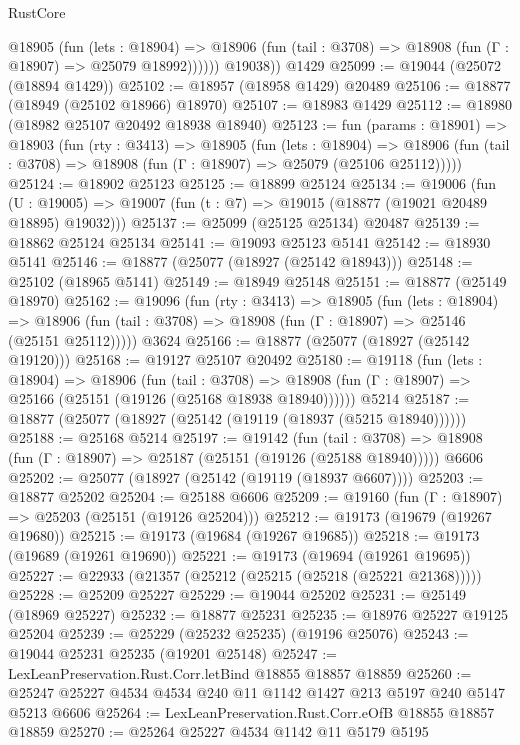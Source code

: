 \begin{lexlean}{RustCore}
\begin{coremodule}
            @18905
              (fun (lets : @18904) =>
              @18906 (fun (tail : @3708) => @18908 (fun (Γ : @18907) => @25079 @18992))))))
        @19038))
    @1429
@25099 := @19044 (@25072 (@18894 @1429))
@25102 := @18957 (@18958 @1429) @20489
@25106 := @18877 (@18949 (@25102 @18966) @18970)
@25107 := @18983 @1429
@25112 := @18980 (@18982 @25107 @20492 @18938 @18940)
@25123 := fun (params : @18901) =>
  @18903
    (fun (rty : @3413) =>
    @18905
      (fun (lets : @18904) =>
      @18906 (fun (tail : @3708) => @18908 (fun (Γ : @18907) => @25079 (@25106 @25112)))))
@25124 := @18902 @25123
@25125 := @18899 @25124
@25134 := @19006
    (fun (U : @19005) => @19007 (fun (t : @7) => @19015 (@18877 (@19021 @20489 @18895) @19032)))
@25137 := @25099 (@25125 @25134) @20487
@25139 := @18862 @25124 @25134
@25141 := @19093 @25123 @5141
@25142 := @18930 @5141
@25146 := @18877 (@25077 (@18927 (@25142 @18943)))
@25148 := @25102 (@18965 @5141)
@25149 := @18949 @25148
@25151 := @18877 (@25149 @18970)
@25162 := @19096
    (fun (rty : @3413) =>
    @18905
      (fun (lets : @18904) =>
      @18906 (fun (tail : @3708) => @18908 (fun (Γ : @18907) => @25146 (@25151 @25112)))))
    @3624
@25166 := @18877 (@25077 (@18927 (@25142 @19120)))
@25168 := @19127 @25107 @20492
@25180 := @19118
    (fun (lets : @18904) =>
    @18906
      (fun (tail : @3708) =>
      @18908 (fun (Γ : @18907) => @25166 (@25151 (@19126 (@25168 @18938 @18940))))))
    @5214
@25187 := @18877 (@25077 (@18927 (@25142 (@19119 (@18937 (@5215 @18940))))))
@25188 := @25168 @5214
@25197 := @19142
    (fun (tail : @3708) => @18908 (fun (Γ : @18907) => @25187 (@25151 (@19126 (@25188 @18940)))))
    @6606
@25202 := @25077 (@18927 (@25142 (@19119 (@18937 @6607))))
@25203 := @18877 @25202
@25204 := @25188 @6606
@25209 := @19160 (fun (Γ : @18907) => @25203 (@25151 (@19126 @25204)))
@25212 := @19173 (@19679 (@19267 @19680))
@25215 := @19173 (@19684 (@19267 @19685))
@25218 := @19173 (@19689 (@19261 @19690))
@25221 := @19173 (@19694 (@19261 @19695))
@25227 := @22933 (@21357 (@25212 (@25215 (@25218 (@25221 @21368)))))
@25228 := @25209 @25227
@25229 := @19044 @25202
@25231 := @25149 (@18969 @25227)
@25232 := @18877 @25231
@25235 := @18976 @25227 @19125 @25204
@25239 := @25229 (@25232 @25235) (@19196 @25076)
@25243 := @19044 @25231 @25235 (@19201 @25148)
@25247 := LexLeanPreservation.Rust.Corr.letBind @18855 @18857 @18859
@25260 := @25247 @25227 @4534 @4534 @240 @11 @1142 @1427 @213 @5197 @240 @5147 @5213 @6606
@25264 := LexLeanPreservation.Rust.Corr.eOfB @18855 @18857 @18859
@25270 := @25264 @25227 @4534 @1142 @11 @5179 @5195

\end{coremodule}
\end{lexlean}
